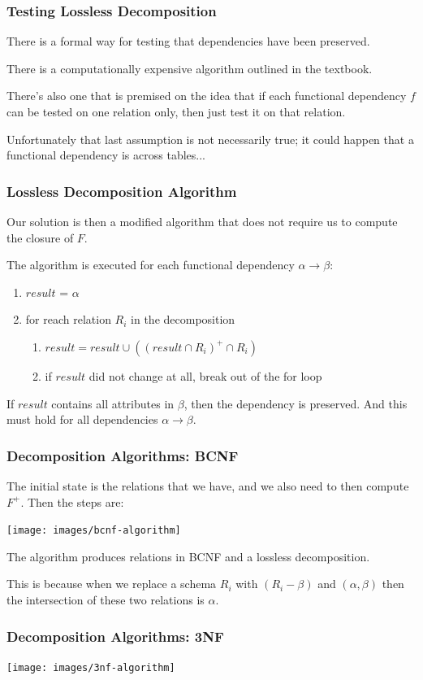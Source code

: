 \begin{frame}
\frametitle{Testing Lossless Decomposition}

There is a formal way for testing that dependencies have been preserved. 

There is a computationally expensive algorithm outlined in the textbook. 

There's also one that is premised on the idea that if each functional dependency $f$ can be tested on one relation only, then just test it on that relation. 

Unfortunately that last assumption is not necessarily true; it could happen that a functional dependency is across tables...

\end{frame}


\begin{frame}
\frametitle{Lossless Decomposition Algorithm}

Our solution is then a modified algorithm that does not require us to compute the closure of $F$. 

The algorithm is executed for each functional dependency $\alpha \rightarrow \beta$:


\begin{enumerate}
	\item $result$ = $\alpha$
	\item for reach relation $R_{i}$ in the decomposition
	\begin{enumerate}
		\item $result = result \cup (  (result \cap R_{i})^{+} \cap R_{i} )$
	    \item if $result$ did not change at all, break out of the for loop
	    \end{enumerate}
\end{enumerate}

If $result$ contains all attributes in $\beta$, then the dependency is preserved. And this must hold for all dependencies $\alpha \rightarrow \beta$.

\end{frame}



\begin{frame}
\frametitle{Decomposition Algorithms: BCNF}
The initial state is the relations that we have, and we also need to then compute $F^{+}$. Then the steps are:

\begin{center}
\texttt{[image: images/bcnf-algorithm]}
\end{center}

The algorithm produces relations in BCNF and a lossless decomposition. 

This is because when we replace a schema $R_{i}$ with $(R_{i} - \beta)$ and $(\alpha, \beta)$ then the intersection of these two relations is $\alpha$.

\end{frame}



\begin{frame}
\frametitle{Decomposition Algorithms: 3NF}


\begin{center}
\texttt{[image: images/3nf-algorithm]}
\end{center}



\end{frame}






